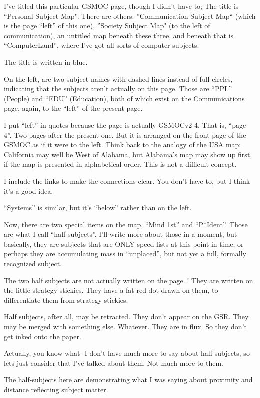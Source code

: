 \documentclass[oneside]{book}
\begin{document}
I've titled this particular GSMOC page, though I didn't have to; The
title is ``Personal Subject Map". There are others: ''Communication
Subject Map`` (which is the page ``left'' of this one), ''Society Subject
Map" (to the left of communication), an untitled map beneath these
three, and beneath that is ``ComputerLand'', where I've got all sorts of
computer subjects.

The title is written in blue.

On the left, are two subject names with dashed lines instead of full
circles, indicating that the subjects aren't actually on this
page. Those are ``PPL'' (People) and ``EDU'' (Education), both of which
exist on the Communications page, again, to the ``left'' of the present
page.

I put ``left'' in quotes because the page is actually GSMOCv2-4. That
is, ``page 4''. Two pages after the present one. But it is arranged on
the front page of the GSMOC as if it were to the left. Think back to
the analogy of the USA map: California may well be West of Alabama,
but Alabama's map may show up first, if the map is presented in
alphabetical order. This is not a difficult concept.

I include the links to make the connections clear. You don't have to,
but I think it's a good idea.

``Systems'' is similar, but it's ``below'' rather than on the left.

Now, there are two special items on the map, ``Mind 1st'' and
``P*Ident''. Those are what I call ``half subjects''. I'll write more
about those in a moment, but basically, they are subjects that are
ONLY speed lists at this point in time, or perhaps they are
accumulating mass in ``unplaced'', but not yet a full, formally
recognized subject.

The two half subjects are not actually written on the page..! They are
written on the little strategy stickies. They have a fat red dot drawn
on them, to differentiate them from strategy stickies.

Half subjects, after all, may be retracted. They don't appear on the
GSR. They may be merged with something else. Whatever. They are in
flux. So they don't get inked onto the paper.

Actually, you know what- I don't have much more to say about
half-subjects, so lets just consider that I've talked about them. Not
much more to them.

The half-subjects here are demonstrating what I was saying about
proximity and distance reflecting subject matter.
\end{document}
